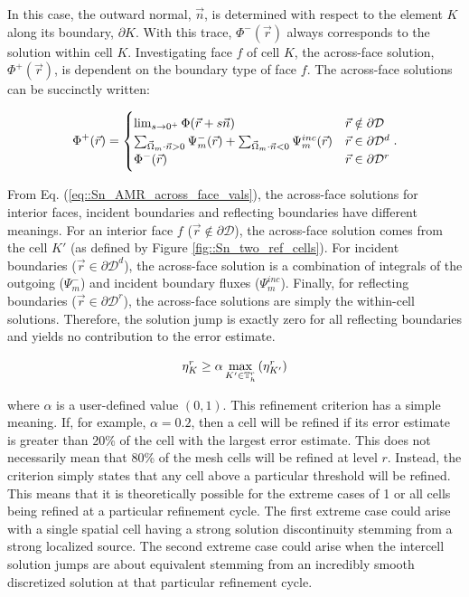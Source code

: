 \noindent In this case, the outward normal, $\vec{n}$, is determined with respect to the element $K$ along its boundary, $\partial K$. With this trace, $\Phi^- (\vec{r})$ always corresponds to the solution within cell $K$. Investigating face $f$ of cell $K$, the across-face solution, $\Phi^+ (\vec{r})$, is dependent on the boundary type of face $f$. The across-face solutions can be succinctly written:

\begin{equation}
\label{eq::Sn_AMR_across_face_vals}
\Phi^+ (\vec{r}) = 
\begin{cases}
\lim\displaylimits_{s \rightarrow 0^{+}} \Phi (\vec{r} + s \vec{n}) & \vec{r} \notin \partial \mathcal{D} \\
\sum\displaylimits_{\vec{\Omega}_m \cdot \vec{n} > 0}  \Psi_m^- (\vec{r}) + \sum\displaylimits_{\vec{\Omega}_m \cdot \vec{n} < 0} \Psi_{m}^{inc} (\vec{r}) & \vec{r} \in \partial \mathcal{D}^d \\
\Phi^- (\vec{r}) & \vec{r} \in \partial \mathcal{D}^r
\end{cases}.
\end{equation}

\noindent From Eq. (\ref{eq::Sn_AMR_across_face_vals}), the across-face solutions for interior faces, incident boundaries and reflecting boundaries have different meanings. For an interior face $f$ ($\vec{r} \notin \partial \mathcal{D}$), the across-face solution comes from the cell $K'$ (as defined by Figure \ref{fig::Sn_two_ref_cells}). For incident boundaries ($\vec{r} \in \partial \mathcal{D}^d$), the across-face solution is a combination of integrals of the outgoing ($\Psi_m^-$) and incident boundary fluxes ($\Psi_m^{inc}$). Finally, for reflecting boundaries ($\vec{r} \in \partial \mathcal{D}^r$), the across-face solutions are simply the within-cell solutions. Therefore, the solution jump is exactly zero for all reflecting boundaries and yields no contribution to the error estimate.

\begin{equation}
\label{eq::Sn_AMR_err_crit}
\eta_K^r \geq \alpha \max\displaylimits_{K' \in \mathbb{T}_h^r} \left(  \eta_{K'}^{r} \right)
\end{equation}

\noindent where $\alpha$ is a user-defined value $(0,1)$. This refinement criterion has a simple meaning. If, for example, $\alpha = 0.2$, then a cell will be refined if its error estimate is greater than 20\% of the cell with the largest error estimate. This does not necessarily mean that 80\% of the mesh cells will be refined at level $r$. Instead, the criterion simply states that any cell above a particular threshold will be refined. This means that it is theoretically possible for the extreme cases of 1 or all cells being refined at a particular refinement cycle. The first extreme case could arise with a single spatial cell having a strong solution discontinuity stemming from a strong localized source. The second extreme case could arise when the intercell solution jumps are about equivalent stemming from an incredibly smooth discretized solution at that particular refinement cycle.



